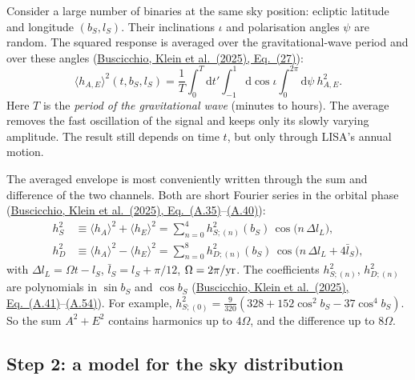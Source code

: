 \documentclass[11pt,a4paper]{article}
\newcommand{\urlPtwo}{https://arxiv.org/pdf/2410.08263}
\newcommand{\PtwoEq}[1]{\href{\urlPtwo}{Buscicchio, Klein et al.~(2025), Eq.~(#1)}}
\newcommand{\dd}{\mathrm{d}}
\begin{document}
Consider a large number of binaries at the same sky position: ecliptic latitude and
longitude $(b_S,l_S)$. Their inclinations $\iota$ and polarisation angles $\psi$ are
random. The squared response is averaged over the gravitational-wave period and over
these angles (\PtwoEq{27}):
\begin{equation}
  \langle h_{A,E}\rangle^2(t,b_S,l_S) = \frac{1}{T}\int_0^T \dd t'
  \int_{-1}^{1}\dd\cos\iota \int_0^{2\pi}\dd\psi\ h^2_{A,E}.
  \label{eq:env27}
\end{equation}
Here $T$ is the \emph{period of the gravitational wave} (minutes to hours). The
average removes the fast oscillation of the signal and keeps only its slowly
varying amplitude. The result still depends on time $t$, but only through LISA's
annual motion.

The averaged envelope is most conveniently written through the sum and difference
of the two channels. Both are short Fourier series in the orbital phase
(\PtwoEq{A.35}--\href{\urlPtwo}{(A.40)}):
\begin{align}
  h_S^2 &\equiv \langle h_A\rangle^2 + \langle h_E\rangle^2
         = \sum_{n=0}^{4} h^2_{S;(n)}(b_S)\, \cos\big(n\,\Delta l_L\big), \\
  h_D^2 &\equiv \langle h_A\rangle^2 - \langle h_E\rangle^2
         = \sum_{n=0}^{8} h^2_{D;(n)}(b_S)\, \cos\big(n\,\Delta l_L + 4\bar l_S\big),
\end{align}
with $\Delta l_L = \Omega t - l_S$, $\bar l_S = l_S + \pi/12$, $\Omega = 2\pi/{\rm yr}$.
The coefficients $h^2_{S;(n)}$, $h^2_{D;(n)}$ are polynomials in $\sin b_S$ and
$\cos b_S$ (\PtwoEq{A.41}--\href{\urlPtwo}{(A.54)}). For example,
$h^2_{S;(0)} = \tfrac{9}{320}\left(328 + 152\cos^2 b_S - 37\cos^4 b_S\right)$.
So the sum $A^2+E^2$ contains harmonics up to $4\Omega$, and the difference up to
$8\Omega$.

\subsection{Step 2: a model for the sky distribution}
\end{document}
